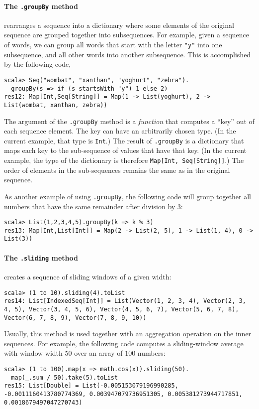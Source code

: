 \paragraph*{The \lstinline!.groupBy! method}

rearranges a sequence into a dictionary where some elements of the
original sequence are grouped together into subsequences. For example,
given a sequence of words, we can group all words that start with
the letter \lstinline!"y"! into one subsequence, and all other words
into another subsequence. This is accomplished by the following code,
\begin{lstlisting}
scala> Seq("wombat", "xanthan", "yoghurt", "zebra").
  groupBy(s => if (s startsWith "y") 1 else 2)
res12: Map[Int,Seq[String]] = Map(1 -> List(yoghurt), 2 -> List(wombat, xanthan, zebra))
\end{lstlisting}
The argument of the \lstinline!.groupBy! method is a \emph{function}
that computes a ``key'' out of each sequence element. The key can
have an arbitrarily chosen type. (In the current example, that type
is \lstinline!Int!.) The result of \lstinline!.groupBy! is a dictionary
that maps each key to the sub-sequence of values that have that key.
(In the current example, the type of the dictionary is therefore \lstinline!Map[Int, Seq[String]]!.)
The order of elements in the sub-sequences remains the same as in
the original sequence.

As another example of using \lstinline!.groupBy!, the following code
will group together all numbers that have the same remainder after
division by $3$:
\begin{lstlisting}
scala> List(1,2,3,4,5).groupBy(k => k % 3)
res13: Map[Int,List[Int]] = Map(2 -> List(2, 5), 1 -> List(1, 4), 0 -> List(3))
\end{lstlisting}


\paragraph*{The \lstinline!.sliding! method}

creates a sequence of sliding windows of a given width:
\begin{lstlisting}
scala> (1 to 10).sliding(4).toList
res14: List[IndexedSeq[Int]] = List(Vector(1, 2, 3, 4), Vector(2, 3, 4, 5), Vector(3, 4, 5, 6), Vector(4, 5, 6, 7), Vector(5, 6, 7, 8), Vector(6, 7, 8, 9), Vector(7, 8, 9, 10))
\end{lstlisting}
Usually, this method is used together with an aggregation operation
on the inner sequences. For example, the following code computes a
sliding-window average with window width $50$ over an array of $100$
numbers:
\begin{lstlisting}
scala> (1 to 100).map(x => math.cos(x)).sliding(50).
  map(_.sum / 50).take(5).toList
res15: List[Double] = List(-0.005153079196990285, -0.0011160413780774369, 0.003947079736951305, 0.005381273944717851, 0.0018679497047270743)
\end{lstlisting}



